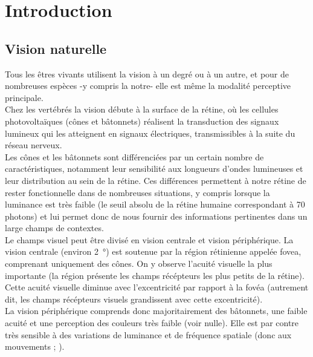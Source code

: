 
\chapter{Introduction} %
\label{Introduction} %


\newcommand{\keyword}[1]{\textbf{#1}}
\newcommand{\tabhead}[1]{\textbf{#1}}
\newcommand{\code}[1]{\texttt{#1}}
\newcommand{\file}[1]{\texttt{\bfseries#1}}
\newcommand{\option}[1]{\texttt{\itshape#1}}


\section{Vision naturelle}
Tous  les êtres vivants utilisent la vision à un degré ou à un autre, et pour de nombreuses espèces -y compris la notre- elle est même la modalité perceptive principale.\\

Chez les vertébrés la vision débute à la surface de la rétine, où les cellules photovoltaïques (cônes et bâtonnets) réalisent la transduction des signaux lumineux qui les atteignent en signaux électriques, transmissibles à la suite du réseau nerveux.\\
Les cônes et les bâtonnets sont différenciées par un certain nombre de caractéristiques, notamment leur sensibilité aux longueurs d'ondes lumineuses et leur distribution au sein de la rétine. Ces différences permettent à notre rétine de rester fonctionnelle dans de nombreuses situations, y compris lorsque la luminance est très faible (le seuil absolu de la rétine humaine correspondant à 70 photons) et lui permet donc de nous fournir des informations pertinentes dans un large champs de contextes.\\
Le champs visuel peut être divisé en vision centrale et vision périphérique. La vision centrale (environ \SI{2}{\degree}) est soutenue par la région rétinienne appelée fovea, comprenant uniquement des cônes. On y observe l'acuité visuelle la plus importante (la région présente les champs récépteurs les plus petits de la rétine). Cette acuité visuelle diminue avec l'excentricité par rapport à la fovéa (autrement dit, les champs récépteurs visuels grandissent avec cette excentricité).\\
La vision périphérique comprends donc majoritairement des bâtonnets, une faible acuité et une perception des couleurs très faible (voir nulle). Elle est par contre très sensible à des variations de luminance et de fréquence spatiale (donc aux mouvements ;  \cite{Werner2014}).\\

